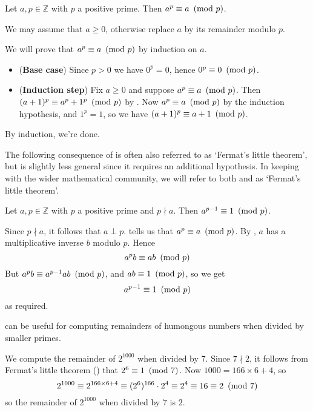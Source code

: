 \begin{theorem} \label{thmFermatLittle} 
Let $a,p \in \mathbb{Z}$ with $p$ a positive prime. Then $a^p \equiv a ~\left(\text{mod}~p\right)$.
\end{theorem}
\begin{cproof}
We may assume that $a \ge 0$, otherwise replace $a$ by its remainder modulo $p$.

We will prove that $a^{p} \equiv a ~\left(\text{mod}~p\right)$ by induction on $a$.
\begin{itemize}
\item (\textbf{Base case}) Since $p > 0$ we have $0^p=0$, hence $0^p \equiv 0 ~\left(\text{mod}~p\right)$.
\item (\textbf{Induction step}) Fix $a \ge 0$ and suppose $a^p \equiv a ~\left(\text{mod}~p\right)$. Then $(a+1)^p \equiv a^p+1^p ~\left(\text{mod}~p\right)$ by . Now $a^p \equiv a ~\left(\text{mod}~p\right)$ by the induction hypothesis, and $1^p = 1$, so we have $(a+1)^p \equiv a+1 ~\left(\text{mod}~p\right)$.
\end{itemize}
By induction, we're done.
\end{cproof}

The following consequence of  is often also referred to as `Fermat's little theorem', but is slightly less general since it requires an additional hypothesis. In keeping with the wider mathematical community, we will refer to both  and  as `Fermat's little theorem'.

\begin{corollary}
\label{corFermatLittleAlt}
Let $a,p \in \mathbb{Z}$ with $p$ a positive prime and $p \nmid a$. Then $a^{p-1} \equiv 1 ~\left(\text{mod}~p\right)$.
\end{corollary}
\begin{cproof}
Since $p \nmid a$, it follows that $a \perp p$.  tells us that $a^p \equiv a ~\left(\text{mod}~p\right)$. By , $a$ has a multiplicative inverse $b$ modulo $p$. Hence
\[ a^{p}b \equiv ab ~\left(\text{mod}~p\right) \]
But $a^{p}b \equiv a^{p-1}ab ~\left(\text{mod}~p\right)$, and $ab \equiv 1 ~\left(\text{mod}~p\right)$, so we get
\[ a^{p-1} \equiv 1 ~\left(\text{mod}~p\right) \]
as required.
\end{cproof}

 can be useful for computing remainders of humongous numbers when divided by smaller primes.

\begin{example}
We compute the remainder of $2^{1000}$ when divided by $7$. Since $7 \nmid 2$, it follows from Fermat's little theorem () that $2^6 \equiv 1 ~\left(\text{mod}~7\right)$. Now $1000 = 166 \times 6 + 4$, so
\[ 2^{1000} \equiv 2^{166 \times 6 + 4} \equiv (2^6)^{166} \cdot 2^4 \equiv 2^4 \equiv 16 \equiv 2 ~\left(\text{mod}~7\right) \]
so the remainder of $2^{1000}$ when divided by $7$ is $2$.
\end{example}

